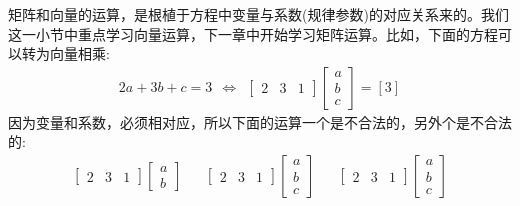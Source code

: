 \documentclass[12pt]{article}
\numberwithin{figure}{section}
\newenvironment{fullmodel}{
			\smallskip\noindent
			\begin{minipage}{\textwidth+\marginparwidth+\marginparsep}\smallskip\smallskip}
			{\smallskip\smallskip\end{minipage}\vspace{.1in}
			}
\numberwithin{equation}{section}
\begin{document}
\begin{fullmodel}
	\begin{tcolorbox}[title=变量和系数的对应关系]
		矩阵和向量的运算，是根植于方程中变量与系数(规律参数)的对应关系来的。我们这一小节中重点学习向量运算，下一章中开始学习矩阵运算。比如，下面的方程可以转为向量相乘:
		\begin{align*}
			2a + 3b + c = 3 \ \ \Leftrightarrow \ \ \begin{bmatrix}
				2 & 3 & 1
			\end{bmatrix} \begin{bmatrix}
				a \\
				b \\
				c
			\end{bmatrix} = [3] 
		\end{align*}
		因为变量和系数，必须相对应，所以下面的运算一个是不合法的，另外个是不合法的:
		\begin{align*}
			\begin{bmatrix}
				2 & 3 & 1
			\end{bmatrix} \begin{bmatrix}
				a \\
				b 
			\end{bmatrix} & & \begin{bmatrix}
				2 & 3 & 1
			\end{bmatrix} \begin{bmatrix}
				a \\
				b \\
				c
			\end{bmatrix} & & \begin{bmatrix}
				2 & 3 & 1
			\end{bmatrix} \begin{bmatrix}
				a \\
				b \\
				c 
			\end{bmatrix}
		\end{align*}
	\end{tcolorbox}
\end{fullmodel}
\end{document}
